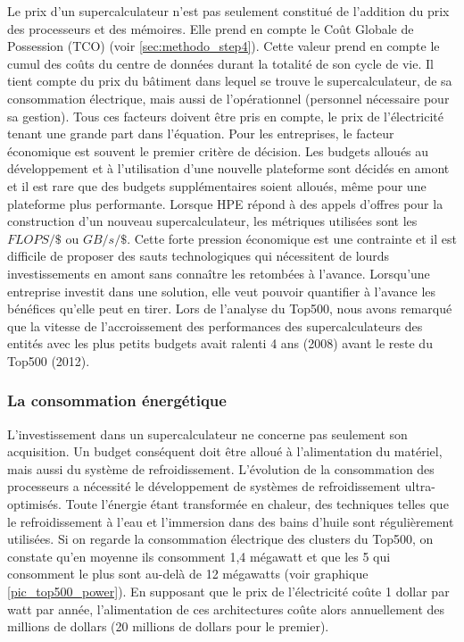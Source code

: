         Le prix d'un supercalculateur n'est pas seulement constitué de l'addition du prix des processeurs et des mémoires. Elle prend en compte le Coût Globale de Possession (TCO) (voir \autoref{sec:methodo_step4}). Cette valeur prend en compte le cumul des coûts du centre de données durant la totalité de son cycle de vie. Il tient compte du prix du bâtiment dans lequel se trouve le supercalculateur, de sa consommation électrique, mais aussi de l'opérationnel (personnel nécessaire pour sa gestion). Tous ces facteurs doivent être pris en compte, le prix de l'électricité tenant une grande part dans l'équation. 
        Pour les entreprises, le facteur économique est souvent le premier critère de décision. Les budgets alloués au développement et à l'utilisation d'une nouvelle plateforme sont décidés en amont et il est rare que des budgets supplémentaires soient alloués, même pour une plateforme plus performante. Lorsque HPE répond à des appels d'offres pour la construction d'un nouveau supercalculateur, les métriques utilisées sont les $FLOPS/\$$ ou $GB/s/\$$. Cette forte pression économique est une contrainte et il est difficile de proposer des sauts technologiques qui nécessitent de lourds investissements en amont sans connaître les retombées à l'avance. Lorsqu'une entreprise investit dans une solution, elle veut pouvoir quantifier à l'avance les bénéfices qu'elle peut en tirer. Lors de l'analyse du Top500, nous avons remarqué que la vitesse de l'accroissement des performances des supercalculateurs des entités avec les plus petits budgets avait ralenti 4 ans (2008) avant le reste du Top500 (2012). 
    
        
    \subsubsection{La consommation énergétique}\label{sec:edl_chal_energie}
  
        L'investissement dans un supercalculateur ne concerne pas seulement son acquisition. Un budget conséquent doit être alloué à l'alimentation du matériel, mais aussi du système de refroidissement. L’évolution de la consommation des processeurs a nécessité le développement de systèmes de refroidissement ultra-optimisés. Toute l’énergie étant transformée en chaleur, des techniques telles que le refroidissement à l’eau et l’immersion dans des bains d’huile sont régulièrement utilisées. Si on regarde la consommation électrique des clusters du Top500, on constate qu'en moyenne ils consomment 1,4 mégawatt et que les 5 qui consomment le plus sont au-delà de 12 mégawatts (voir graphique \ref{pic_top500_power}). En supposant que le prix de l'électricité coûte 1 dollar par watt par année, l'alimentation de ces architectures coûte alors annuellement des millions de dollars (20 millions de dollars pour le premier).
        

